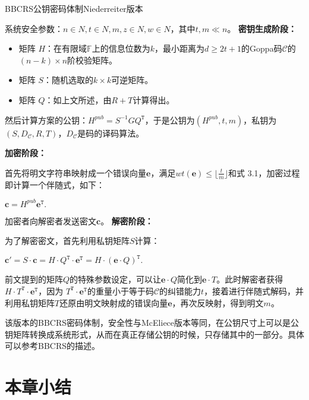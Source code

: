 \begin{breakablealgorithm}
	\small
	\renewcommand{\algorithmicrequire}{\textbf{Input:}}
	\renewcommand{\algorithmicensure}{\textbf{Output:}}
	\caption{BBCRS公钥密码体制Niederreiter版本}
	\label{alg:BBCRS}
	\begin{algorithmic}	
		\State
		系统安全参数：$n \in N, t \in N, m, z \in N, w \in N$，其中$t,m \ll n$。
		\State
		\textbf{密钥生成阶段：}
		
		\begin{itemize}
			\item 矩阵 $H$：在有限域$\mathbb{F}$上的信息位数为$k$，最小距离为$d \geq 2t + 1$的Goppa码$\mathcal{C}$的$(n-k) \times n$阶校验矩阵。
			\item 矩阵 $S$：随机选取的$k \times k$可逆矩阵。
			\item 矩阵 $Q$：如上文所述，由$R + T$计算得出。
		\end{itemize}
		
		然后计算方案的公钥：$H^{pub} = S^{-1}GQ^\mathtt{T}$，于是公钥为$(H^{pub}, t, m)$，私钥为$(S,D_\mathcal{C},R,T)$，$D_\mathcal{C}$是码的译码算法。
		
		\State
		\textbf{加密阶段：}
		
		首先将明文字符串映射成一个错误向量$\mathbf{e}$，满足$wt(\mathbf{e}) \leq \lfloor \frac{t}{m} \rfloor$和式 3.1，加密过程即计算一个伴随式，如下：
		
		\begin{center}
			$\mathbf{c} = H^{pub}\mathbf{e}^\mathtt{T}.$
		\end{center}
		
		加密者向解密者发送密文$\mathbf{c}$。
		\State
		\textbf{解密阶段：}
		
		为了解密密文，首先利用私钥矩阵$S$计算：
		\begin{center}
			$\mathbf{c}' = S \cdot \mathbf{c} = H \cdot Q^\mathtt{T} \cdot \mathbf{e}^\mathtt{T} = H \cdot (\mathbf{e} \cdot Q)^\mathtt{T}.$
		\end{center}
		
		前文提到的矩阵$Q$的特殊参数设定，可以让$\mathbf{e} \cdot Q$简化到$\mathbf{e} \cdot T$。此时解密者获得$H \cdot T^\mathtt{T} \cdot \mathbf{e}^\mathtt{T}$，因为 $T^\mathtt{T} \cdot \mathbf{e}^\mathtt{T}$的重量小于等于码$\mathcal{C}$的纠错能力$t$，接着进行伴随式解码，并利用私钥矩阵$T$还原由明文映射成的错误向量$\mathbf{e}$，再次反映射，得到明文$m$。
	\end{algorithmic}
\end{breakablealgorithm}
该版本的BBCRS密码体制，安全性与McEliece版本等同，在公钥尺寸上可以是公钥矩阵转换成系统形式，从而在真正存储公钥的时候，只存储其中的一部分。具体可以参考BBCRS的描述。

\section{本章小结}